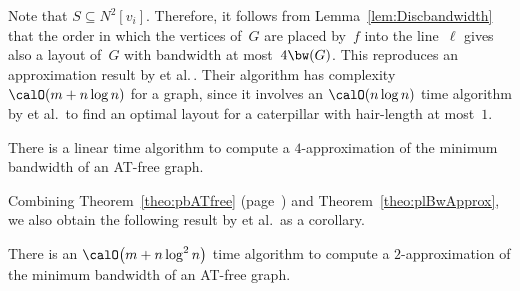 Note that $S \subseteq N^2[v_i]$.
Therefore, it follows from Lemma~\ref{lem:Discbandwidth} that the order in which the vertices of~$G$ are placed by~$f$ into the line~$\ell$ gives also a layout of~$G$ with bandwidth at most~$4 \bw(G)$.
This reproduces an approximation result by  et al.\,\cite{KlokKratMuel1999}.
Their algorithm has complexity~$\calO(m + n \log n)$ for a graph, since it involves an $\calO(n \log n)$ time algorithm by  et al.\,\cite{AssPecSysZak1981} to find an optimal layout for a caterpillar with hair-length at most~$1$.

\begin{corollary}
    \label{cor:ATfreeBWApprox}
There is a linear time algorithm to compute a \( 4 \)-approximation of the minimum bandwidth of an AT-free graph.
\end{corollary}

Combining Theorem~\ref{theo:pbATfree} (page~\pageref{theo:pbATfree}) and Theorem~\ref{theo:plBwApprox}, we also obtain the following result by  et al.\,\cite{KlokKratMuel1999} as a corollary.

\begin{corollary}
    \label{cor:bw-AT-2-appr}
There is an \( \calO \big( m + n \log^2 n \big) \) time algorithm to compute a \( 2 \)-approximation of the minimum bandwidth of an AT-free graph.
\end{corollary}
